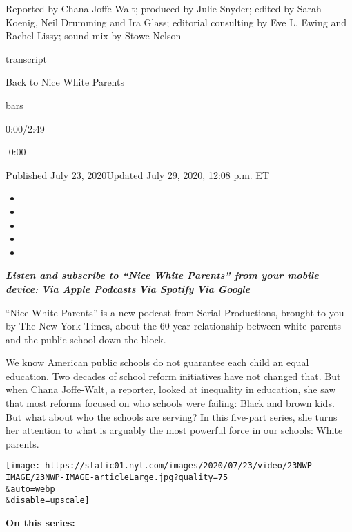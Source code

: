Reported by Chana Joffe-Walt; produced by Julie Snyder; edited by Sarah
Koenig, Neil Drumming and Ira Glass; editorial consulting by Eve L.
Ewing and Rachel Lissy; sound mix by Stowe Nelson

transcript

Back to Nice White Parents

bars

0:00/2:49

-0:00

Published July 23, 2020Updated July 29, 2020, 12:08 p.m. ET

\begin{itemize}
\item
\item
\item
\item
\item
\end{itemize}

\emph{\textbf{Listen and subscribe to ``Nice White Parents'' from your
mobile device:}}
\textbf{\href{https://podcasts.apple.com/us/podcast/nice-white-parents/id1524080195}{\emph{Via
Apple Podcasts}}} \emph{\textbf{\textbar{}}}
\textbf{\href{https://open.spotify.com/show/7oBSLCZFCgpdCaBjIG8mLV?si=YcEPLD3xT2ejXmpQz-tRpw}{\emph{Via
Spotify}}} \emph{\textbf{\textbar{}}}
\textbf{\href{https://podcasts.google.com/feed/aHR0cHM6Ly9yc3MuYXJ0MTkuY29tL25pY2Utd2hpdGUtcGFyZW50cw}{\emph{Via
Google}}}

``Nice White Parents'' is a new podcast from Serial Productions, brought
to you by The New York Times, about the 60-year relationship between
white parents and the public school down the block.

We know American public schools do not guarantee each child an equal
education. Two decades of school reform initiatives have not changed
that. But when Chana Joffe-Walt, a reporter, looked at inequality in
education, she saw that most reforms focused on who schools were
failing: Black and brown kids. But what about who the schools are
serving? In this five-part series, she turns her attention to what is
arguably the most powerful force in our schools: White parents.

\texttt{[image: https://static01.nyt.com/images/2020/07/23/video/23NWP-IMAGE/23NWP-IMAGE-articleLarge.jpg?quality=75\\\&auto=webp\\\&disable=upscale]}

\textbf{On this series:}

